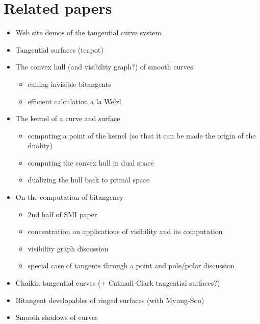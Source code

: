 \documentclass[12pt]{article}
\begin{document}

\section{Related papers}

\begin{itemize}
\item Web site demos of the tangential curve system
\item Tangential surfaces (teapot)
\item The convex hull (and visibility graph?) of smooth curves
\begin{itemize}
\item culling invisible bitangents
\item efficient calculation a la Welzl
\end{itemize}
\item The kernel of a curve and surface
\begin{itemize}
\item computing a point of the kernel (so that it can be made the origin
		of the duality)
\item computing the convex hull in dual space
\item dualizing the hull back to primal space
\end{itemize}
\item On the computation of bitangency
\begin{itemize}
\item	2nd half of SMI paper
\item   concentration on applications of visibility and its computation
\item   visibility graph discussion
\item   special case of tangents through a point and pole/polar discussion
\end{itemize}
\item Chaikin tangential curves (+ Catmull-Clark tangential surfaces?)
\item Bitangent developables of ringed surfaces (with Myung-Soo)
\item Smooth shadows of curves
\end{itemize}
\end{document}
